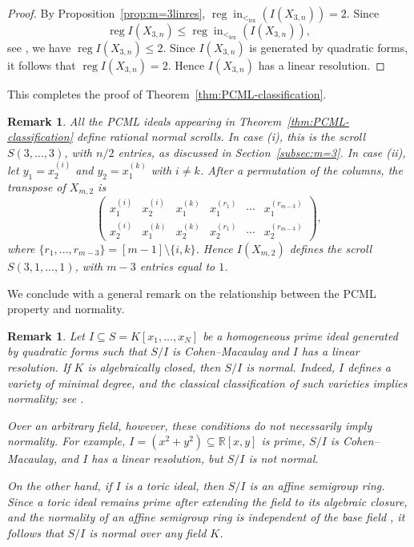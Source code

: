 \documentclass[12pt]{amsart}
\numberwithin{equation}{section}
\newtheorem{Remark}[Theorem]{Remark}
\begin{document}
\begin{proof}
By Proposition~\ref{prop:m=3linres}, $\operatorname{reg}\operatorname{in}_{<_{\mathrm{lex}}}(I(X_{3,n}))=2.$ Since
\[
\operatorname{reg} I(X_{3,n})
\leq
\operatorname{reg}\operatorname{in}_{<_{\mathrm{lex}}}(I(X_{3,n})),
\]
see \cite[Theorem 3.3.4]{HHgtm260}, we have $\operatorname{reg} I(X_{3,n})\leq2$. Since
$I(X_{3,n})$ is generated by quadratic forms, it follows that $\operatorname{reg} I(X_{3,n})=2.$ Hence $I(X_{3,n})$ has a linear resolution.
\end{proof}
This completes the proof of Theorem~\ref{thm:PCML-classification}.


\begin{Remark}\label{rem:pcml-scrolls}
{\em
All the PCML ideals appearing in
Theorem~\ref{thm:PCML-classification}
define rational normal scrolls.
In case (i), this is the scroll
$S(3,\ldots,3)$, with $n/2$ entries,
as discussed in Section~\ref{subsec:m=3}.
In case (ii), let $y_1=x_2^{(i)}$ and
$y_2=x_1^{(k)}$ with $i\neq k$.
After a permutation of the columns,
the transpose of $X_{m,2}$ is
\[
\begin{pmatrix}
x_1^{(i)} & x_2^{(i)} & x_1^{(k)}
& x_1^{(r_1)} & \cdots & x_1^{(r_{m-3})}\\
x_2^{(i)} & x_1^{(k)} & x_2^{(k)}
& x_2^{(r_1)} & \cdots & x_2^{(r_{m-3})}
\end{pmatrix},
\]
where
$\{r_1,\ldots,r_{m-3}\}
=[m-1]\setminus\{i,k\}$.
Hence $I(X_{m,2})$ defines the scroll $S(3,1,\ldots,1)$,
with $m-3$ entries equal to $1$.
}
\end{Remark}

We conclude with a general remark on the relationship
between the PCML property and normality.

\begin{Remark}
{\em 
Let $I\subseteq S=K[x_1,\ldots,x_N]$ be a homogeneous
prime ideal generated by quadratic forms such that
$S/I$ is Cohen--Macaulay and $I$ has a linear
resolution. If $K$ is algebraically closed, then
$S/I$ is normal. Indeed, $I$ defines a variety of
minimal degree, and the classical classification
of such varieties implies normality; see
\cite{EG84,EH87}.

Over an arbitrary field, however, these conditions
do not necessarily imply normality. For example,
$I=(x^2+y^2)\subseteq\mathbb{R}[x,y]$ is prime,
$S/I$ is Cohen--Macaulay, and $I$ has a linear
resolution, but $S/I$ is not normal.

On the other hand, if $I$ is a toric ideal, then
$S/I$ is an affine semigroup ring. Since a toric
ideal remains prime after extending the field
to its algebraic closure, and the normality of
an affine semigroup ring is independent of the
base field \cite[Proposition~1]{Hochster1972},
it follows that $S/I$ is normal over any field $K$.
}
\end{Remark}
\end{document}
